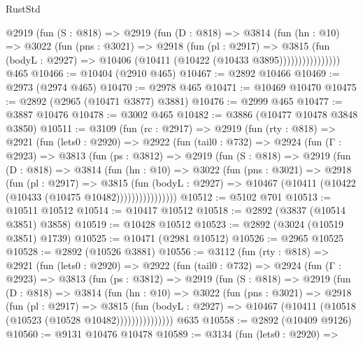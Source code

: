 \begin{lexlean}{RustStd}
\begin{coremodule}
                @2919
                  (fun (S : @818) =>
                  @2919
                    (fun (D : @818) =>
                    @3814
                      (fun (hn : @10) =>
                      @3022
                        (fun (pns : @3021) =>
                        @2918
                          (fun (pl : @2917) =>
                          @3815
                            (fun (bodyL : @2927) =>
                            @10406 (@10411 (@10422 (@10433 @3895))))))))))))))))
    @465
@10466 := @10404 (@2910 @465)
@10467 := @2892 @10466
@10469 := @2973 (@2974 @465)
@10470 := @2978 @465
@10471 := @10469 @10470
@10475 := @2892 (@2965 (@10471 @3877) @3881)
@10476 := @2999 @465
@10477 := @3887 @10476
@10478 := @3002 @465
@10482 := @3886 (@10477 @10478 @3848 @3850)
@10511 := @3109
    (fun (rc : @2917) =>
    @2919
      (fun (rty : @818) =>
      @2921
        (fun (lets0 : @2920) =>
        @2922
          (fun (tail0 : @732) =>
          @2924
            (fun (Γ : @2923) =>
            @3813
              (fun (ps : @3812) =>
              @2919
                (fun (S : @818) =>
                @2919
                  (fun (D : @818) =>
                  @3814
                    (fun (hn : @10) =>
                    @3022
                      (fun (pns : @3021) =>
                      @2918
                        (fun (pl : @2917) =>
                        @3815
                          (fun (bodyL : @2927) =>
                          @10467 (@10411 (@10422 (@10433 (@10475 @10482))))))))))))))))
@10512 := @5102 @701
@10513 := @10511 @10512
@10514 := @10417 @10512
@10518 := @2892 (@3837 (@10514 @3851) @3858)
@10519 := @10428 @10512
@10523 := @2892 (@3024 (@10519 @3851) @1739)
@10525 := @10471 (@2981 @10512)
@10526 := @2965 @10525
@10528 := @2892 (@10526 @3881)
@10556 := @3112
    (fun (rty : @818) =>
    @2921
      (fun (lets0 : @2920) =>
      @2922
        (fun (tail0 : @732) =>
        @2924
          (fun (Γ : @2923) =>
          @3813
            (fun (ps : @3812) =>
            @2919
              (fun (S : @818) =>
              @2919
                (fun (D : @818) =>
                @3814
                  (fun (hn : @10) =>
                  @3022
                    (fun (pns : @3021) =>
                    @2918
                      (fun (pl : @2917) =>
                      @3815
                        (fun (bodyL : @2927) =>
                        @10467 (@10411 (@10518 (@10523 (@10528 @10482)))))))))))))))
    @635
@10558 := @2892 (@10409 @9126)
@10560 := @9131 @10476 @10478
@10589 := @3134
    (fun (lets0 : @2920) =>

\end{coremodule}
\end{lexlean}
